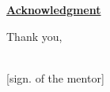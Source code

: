 \documentclass{article}
\begin{document}
\newpage
\begin{center}
    \underline{\textbf{\huge{Acknowledgment}}}
\end{center}
\begin{flushleft}

\end{flushleft}
{\raggedleft Thank you,\\[3ex]
\\[1ex]
[sign. of the mentor]
\par
}
\end{document}
